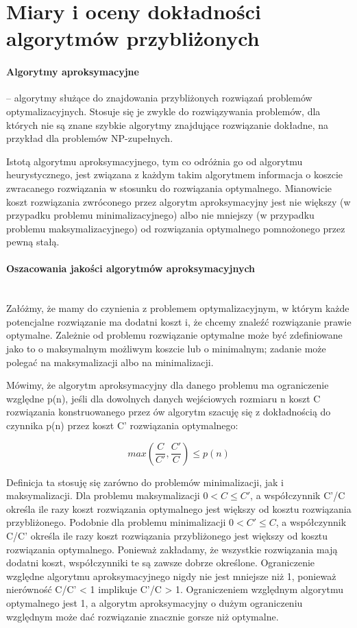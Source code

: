 \documentclass[a4paper,twoside]{report}
\begin{document}
\section{Miary i oceny dokładności algorytmów przybliżonych}

\paragraph{Algorytmy aproksymacyjne} – algorytmy służące do znajdowania przybliżonych rozwiązań problemów optymalizacyjnych. Stosuje się je zwykle do rozwiązywania problemów, dla których nie są znane szybkie algorytmy znajdujące rozwiązanie dokładne, na przykład dla problemów NP-zupełnych.


Istotą algorytmu aproksymacyjnego, tym co odróżnia go od algorytmu heurystycznego, jest związana z każdym takim algorytmem informacja o koszcie zwracanego rozwiązania w stosunku do rozwiązania optymalnego. Mianowicie koszt rozwiązania zwróconego przez algorytm aproksymacyjny jest nie większy (w przypadku problemu minimalizacyjnego) albo nie mniejszy (w przypadku problemu maksymalizacyjnego) od rozwiązania optymalnego pomnożonego przez pewną stałą.

\paragraph{Oszacowania jakości algorytmów aproksymacyjnych\\\\}

Załóżmy, że mamy do czynienia z problemem optymalizacyjnym, w którym każde potencjalne rozwiązanie ma dodatni koszt i, że chcemy znaleźć rozwiązanie prawie optymalne. Zależnie od problemu rozwiązanie optymalne może być zdefiniowane jako to o maksymalnym możliwym koszcie lub o minimalnym; zadanie może polegać na maksymalizacji albo na minimalizacji.


Mówimy, że algorytm aproksymacyjny dla danego problemu ma ograniczenie względne p(n), jeśli dla dowolnych danych wejściowych rozmiaru n koszt C rozwiązania konstruowanego przez ów algorytm szacuję się z dokładnością do czynnika p(n) przez koszt C' rozwiązania optymalnego:

$$ max(\frac{C}{C'},\frac{C'}{C}) \le p(n) $$


Definicja ta stosuję się zarówno do problemów minimalizacji, jak i maksymalizacji. Dla problemu maksymalizacji $ 0 < C \le C' $, a współczynnik C'/C określa ile razy koszt rozwiązania optymalnego jest większy od kosztu rozwiązania przybliżonego. Podobnie dla problemu minimalizacji $ 0 < C' \le C$, a współczynnik C/C' określa ile razy koszt rozwiązania przybliżonego jest większy od kosztu rozwiązania optymalnego. Ponieważ zakładamy, że wszystkie rozwiązania mają dodatni koszt, współczynniki te są zawsze dobrze określone. Ograniczenie względne algorytmu aproksymacyjnego nigdy nie jest mniejsze niż 1, ponieważ nierówność C/C' < 1 implikuje C'/C > 1. Ograniczeniem względnym algorytmu optymalnego jest 1, a algorytm aproksymacyjny o dużym ograniczeniu względnym może dać rozwiązanie znacznie gorsze niż optymalne.
\end{document}
